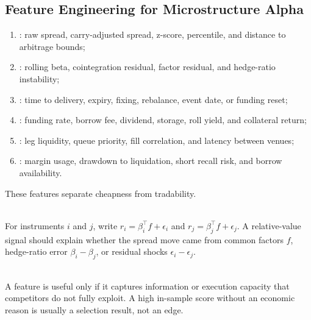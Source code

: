 \subsection{Feature Engineering for Microstructure Alpha}

\begin{taxonomy} 
\begin{enumerate}[label=\roman*.]
\setlength{\itemsep}{0pt}
\item {}: raw spread, carry-adjusted spread, z-score, percentile, and distance to arbitrage bounds;
\item {}: rolling beta, cointegration residual, factor residual, and hedge-ratio instability;
\item {}: time to delivery, expiry, fixing, rebalance, event date, or funding reset;
\item {}: funding rate, borrow fee, dividend, storage, roll yield, and collateral return;
\item {}: leg liquidity, queue priority, fill correlation, and latency between venues;
\item {}: margin usage, drawdown to liquidation, short recall risk, and borrow availability.
\end{enumerate}
These features separate cheapness from tradability.
\end{taxonomy}

\begin{model} \\
For instruments $i$ and $j$, write $r_i=\beta_i^\top f+\epsilon_i$ and $r_j=\beta_j^\top f+\epsilon_j$. A relative-value signal should explain whether the spread move came from common factors $f$, hedge-ratio error $\beta_i-\beta_j$, or residual shocks $\epsilon_i-\epsilon_j$.
\end{model}

\begin{principle} \\
A feature is useful only if it captures information or execution capacity that competitors do not fully exploit. A high in-sample score without an economic reason is usually a selection result, not an edge.
\end{principle}

